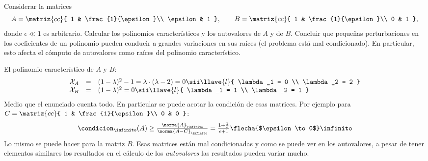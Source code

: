 \begin{enunciado}{\ejercicio}
  Considerar la matrices
  $$
    A =
    \matriz{cc}{
      1 & \frac{1}{\epsilon}\\
      \epsilon & 1
    },
    \qquad
    B =
    \matriz{cc}{
      1 & \frac{1}{\epsilon}\\
      0 & 1
    },
  $$
  donde $\epsilon \ll 1$ es arbitrario. Calcular los polinomios característicos y los autovalores de $A$ y de $B$.
  Concluir que pequeñas perturbaciones en los coeficientes de un polinomio pueden conducir
  a grandes variaciones en sus raíces (el problema está mal condicionado). En particular, esto
  afecta el cómputo de autovalores como raíces del polinomio característico.
\end{enunciado}

El polinomio característico de $A$ y $B$:
$$
  \begin{array}{rcl}
    \mathcal{X}_A & = & (1 - \lambda)^2 - 1 = \lambda \cdot (\lambda - 2) = 0
    \sii
    \llave{l}{
    \lambda_1 = 0                                                             \\
      \lambda_2 = 2
    }                                                                         \\
    \mathcal{X}_B & = & (1 - \lambda)^2 = 0
    \sii
    \llave{l}{
    \lambda_1 = 1                                                             \\
      \lambda_2 = 1
    }
  \end{array}
$$
Medio que el enunciado cuenta todo. En particular se puede acotar la condición de esas matrices.
Por ejemplo para
$C =
  \matriz{cc}{
    1 & \frac{1}{\epsilon}\\
    0 & 0
  }$:
$$
  \begin{array}{c}
    \condicion_\infinito(A) \geq \frac{\norma{A}_\infinito}{\norma{A - C}_\infinito} =
    \frac{1 + \frac{1}{\epsilon}}{\epsilon + 1}
    \flecha{$\epsilon \to 0$}
    \infinito
  \end{array}
$$
Lo mismo se puede hacer para la matriz $B$. Esas matrices están mal condicionadas y como se puede ver en los autovalores,
a pesar de tener elementos similares los resultados en el cálculo de los \textit{autovalores} las resultados pueden variar mucho.

\begin{aportes}
  \item {}
\end{aportes}
